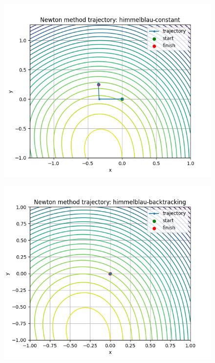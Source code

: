 \documentclass{article}
\begin{document}
\begin{figure}[H]
    \centering
    \includegraphics[width=1\linewidth]{himmelblau-constant.png}
    \label{fig:enter-label}
\end{figure}
\begin{figure}[H]
    \centering
    \includegraphics[width=1\linewidth]{himmelblau-backtracking.png}
    \label{fig:enter-label}
\end{figure}
\end{document}

